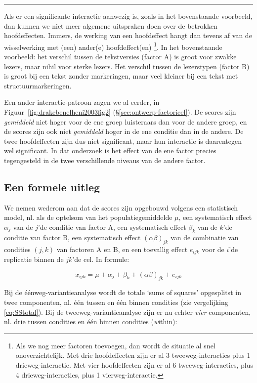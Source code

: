 \documentclass[
]{book}
\begin{document}
\begin{center}\rule{0.5\linewidth}{0.5pt}\end{center}

Als er een significante interactie aanwezig is, zoals in het bovenstaande voorbeeld, dan kunnen we niet meer
algemene uitspraken doen over de betrokken hoofdeffecten. Immers, de
werking van een hoofdeffect hangt dan tevens af van de wisselwerking met
(een) ander(e) hoofdeffect(en) \footnote{Als we nog meer factoren toevoegen, dan wordt de situatie al snel onoverzichtelijk. Met drie hoofdeffecten zijn er al 3 tweeweg-interacties plus 1 drieweg-interactie. Met vier hoofdeffecten zijn er al 6 tweeweg-interacties, plus 4 drieweg-interacties, plus 1 vierweg-interactie.}. In het bovenstaande voorbeeld: het verschil tussen de tekstversies (factor A) is groot voor zwakke lezers, maar nihil voor sterke lezers. Het verschil tussen de lezerstypen (factor B) is groot bij een tekst zonder markeringen, maar veel kleiner bij een tekst met structuurmarkeringen.

Een ander interactie-patroon zagen we al eerder, in
Figuur~\ref{fig:drakebenelheni2003fig2} (§\ref{sec:ontwerp-factorieel}).
De scores zijn \emph{gemiddeld}
niet hoger voor de ene groep luisteraars dan voor de andere groep, en de
scores zijn ook niet \emph{gemiddeld} hoger in de ene conditie dan in de
andere. De twee hoofdeffecten zijn dus niet significant, maar hun interactie
is daarentegen wel significant. In dat onderzoek is het effect van de
ene factor precies tegengesteld in de twee verschillende niveaus
van de andere factor.

\subsection{Een formele uitleg}\label{een-formele-uitleg}

We nemen wederom aan dat de scores zijn opgebouwd volgens een
statistisch model, nl. als de optelsom van het populatiegemiddelde
\(\mu\), een systematisch effect \(\alpha_j\) van de \(j\)'de conditie van
factor A, een systematisch effect \(\beta_k\) van de \(k\)'de conditie van
factor B, een systematisch effect \((\alpha\beta)_{jk}\) van de combinatie
van condities \((j,k)\) van factoren A en B, en een toevallig effect
\(e_{ijk}\) voor de \(i\)'de replicatie binnen de \(jk\)'de cel. In formule:

\[x_{ijk} = \mu + \alpha_{j} + \beta_{k} + (\alpha\beta)_{jk} + e_{ijk}\]

Bij de éénweg-variantieanalyse wordt de totale `sums of squares'
opgesplitst in twee componenten, nl. één tussen en één binnen condities (zie
vergelijking \eqref{eq:SStotal}).
Bij de tweeweg-variantieanalyse zijn er nu
echter \emph{vier} componenten, nl. drie tussen condities en één binnen condities (\emph{w}ithin):
\end{document}
